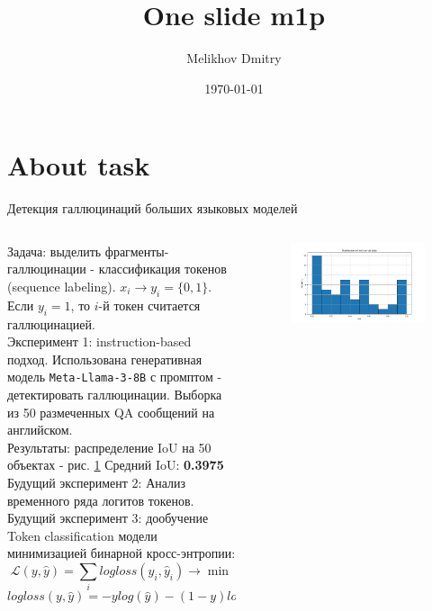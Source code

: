 \documentclass[8pt,pdf,hyperref={unicode}]{beamer}
\title[One slide m1p]{One slide m1p}
\author{Melikhov Dmitry}
\institute[]{MSU}
\date[2022]{\today}
\begin{document}


\section{About task}
\begin{frame}{Детекция галлюцинаций больших языковых моделей}
\begin{columns}
\begin{column}{0.4\textwidth}
    Задача: выделить фрагменты-галлюцинации -  классификация токенов (sequence labeling).
    $x_i \rightarrow y_i = \{0, 1\}$. Если $y_{i} = 1$, то $i$-й токен считается галлюцинацией.\\
    Эксперимент 1: instruction-based подход. Использована генеративная модель \texttt{Meta-Llama-3-8B} с промптом - детектировать галлюцинации.
    Выборка из 50 размеченных QA сообщений на английском.\\
    Результаты: распределение IoU на 50 объектах - рис. \ref{hist}
    Средний IoU: \textbf{0.3975}\\
    Будущий эксперимент 2: Анализ временного ряда логитов токенов.\\
    Будущий эксперимент 3: дообучение Token classification модели минимизацией бинарной кросс-энтропии:
    $$
    \mathcal{L}(y, \hat{y}) = \sum_{i} logloss(y_{i}, \hat{y}_{i}) \rightarrow \min
    $$
    $$
    logloss(y, \hat{y}) = - y log(\hat{y}) - (1 - y) log(1 - \hat{y})
    $$
\end{column}
\begin{column}{0.6\textwidth}
    \begin{figure}
        \centering
        \includegraphics[width=0.8\linewidth]{1 (9).pdf}
        \label{hist}

\end{figure}
\end{column}
\end{columns}
\end{frame}
\end{document}
